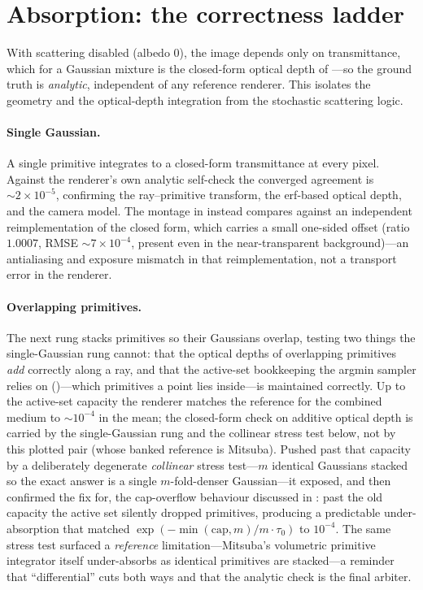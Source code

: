 \section{Absorption: the correctness ladder}
\label{sec:absorption-ladder}

With scattering disabled (albedo $0$), the image depends only on transmittance, which for a Gaussian
mixture is the closed-form optical depth of ---so the ground truth is
\emph{analytic}, independent of any reference renderer. This isolates the geometry and the optical-depth
integration from the stochastic scattering logic.

\paragraph{Single Gaussian.} A single primitive integrates to a closed-form transmittance at every
pixel. Against the renderer's own analytic self-check the converged agreement is $\sim\!2\times10^{-5}$,
confirming the ray--primitive transform, the erf-based optical depth, and the camera model. The montage
in  instead compares against an independent reimplementation of the closed
form, which carries a small one-sided offset (ratio $1.0007$, RMSE $\sim\!7\times10^{-4}$, present even
in the near-transparent background)---an antialiasing and exposure mismatch in that reimplementation,
not a transport error in the renderer.

\paragraph{Overlapping primitives.} The next rung stacks primitives so their Gaussians overlap, testing
two things the single-Gaussian rung cannot: that the optical depths of overlapping primitives \emph{add}
correctly along a ray, and that the active-set bookkeeping the argmin sampler relies on
()---which primitives a point lies inside---is maintained correctly. Up to the active-set
capacity the renderer matches the reference for the combined medium to $\sim\!10^{-4}$ in the mean; the
closed-form check on additive optical depth is carried by the single-Gaussian rung and the collinear
stress test below, not by this plotted pair (whose banked reference is Mitsuba).
Pushed past that capacity by a deliberately degenerate \emph{collinear} stress test---$m$ identical
Gaussians stacked so the exact answer is a single
$m$-fold-denser Gaussian---it exposed, and then confirmed the fix for, the cap-overflow behaviour discussed
in : past the old capacity the active set silently dropped primitives, producing a
predictable under-absorption that matched $\exp(-\min(\text{cap},m)/m \cdot \tau_0)$ to $10^{-4}$. The
same stress test surfaced a \emph{reference} limitation---Mitsuba's volumetric primitive integrator
itself under-absorbs as identical primitives are stacked---a reminder that ``differential'' cuts both
ways and that the analytic check is the final arbiter.

